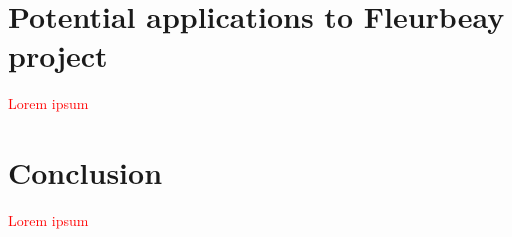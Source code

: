 \documentclass[12pt,a4paper,draft]{article}
\begin{document}
\section{Potential applications to Fleurbeay project}
\textcolor{red}{Lorem ipsum}





\section{Conclusion}
\textcolor{red}{Lorem ipsum}











\newpage
\end{document}
